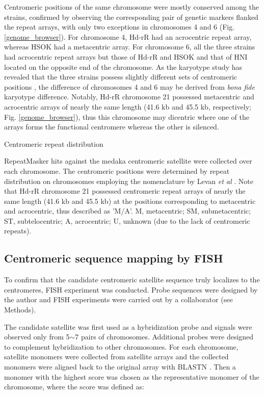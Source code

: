   Centromeric positions of the same chromosome were mostly conserved among the strains, confirmed by observing the corresponding pair of genetic markers flanked the repeat arrays, with only two exceptions in chromosomes 4 and 6 (Fig. \ref{genome_browser}). For chromosome 4, Hd-rR had an acrocentric repeat array, whereas HSOK had a metacentric array. For chromosome 6, all the three strains had acrocentric repeat arrays but those of Hd-rR and HSOK and that of HNI located on the opposite end of the chromosome. As the karyotype study has revealed that the three strains possess slightly different sets of centromeric positions \cite{}, the difference of chromosomes 4 and 6 may be derived from \textit{bona fide} karyotype difference. Notably, Hd-rR chromosome 21 possessed metacentric and acrocentric arrays of nearly the same length (41.6 kb and 45.5 kb, respectively; Fig. \ref{genome_browser}), thus this chromosome may dicentric where one of the arrays forms the functional centromere whereas the other is silenced.


  \begin{table*}[htp]
    \centering
    \caption{Centromeric repeat distribution}
    
    \label{centromeric_repeat_distribution}
    \caption*{{\small
      RepeatMasker hits against the medaka centromeric satellite were collected over each chromosome. The centromeric positions were determined by repeat distribution on chromosomes employing the nomenclature by Levan \textit{et al} \cite{Levan1964}. Note that Hd-rR chromosome 21 possessed centromeric repeat arrays of nearly the same length (41.6 kb and 45.5 kb) at the positions corresponding to metacentric and acrocentric, thus described as 'M/A'. M, metacentric; SM, submetacentric; ST, subtelocentric; A, acrocentric; U, unknown (due to the lack of centromeric repeats).
    }}
  \end{table*}

\subsection*{Centromeric sequence mapping by FISH}
  To confirm that the candidate centromeric satellite sequence truly localizes to the centromeres, FISH experiment was conducted. Probe sequences were designed by the author and FISH experiments were carried out by a collaborator (see Methods).

  The candidate satellite was first used as a hybridization probe and signals were observed only from 5$\sim$7 pairs of chromosomes. Additional probes were designed to complement hybridization to other chromosomes. For each chromosome, satellite monomers were collected from satellite arrays and the collected monomers were aligned back to the original array with BLASTN \cite{Camacho2009}. Then a monomer with the highest score was chosen as the representative monomer of the chromosome, where the score was defined as:

